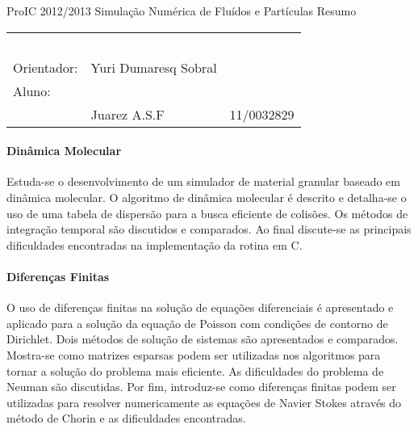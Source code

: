 \documentclass[a4paper,11pt]{article}
\begin{document}
\MakeMyTitlePage
{ProIC 2012/2013}
{Simulação Numérica de Fluídos e Partículas}
{Resumo}
{%
		\begin{tabular}{llr} \
		& & \\[0.05cm]		
		Orientador: & Yuri Dumaresq Sobral & \\
		
		Aluno:& & \\
		& Juarez A.S.F 					& 11/0032829\\

		\end{tabular}
}


\paragraph{Dinâmica Molecular}Estuda-se o desenvolvimento de
um simulador de material granular baseado em dinâmica molecular.
O algoritmo de dinâmica molecular é descrito e detalha-se o
uso de uma tabela de dispersão para a busca eficiente  de
colisões. Os métodos de integração temporal são discutidos e
comparados. Ao final discute-se as principais dificuldades
encontradas na implementação da rotina em C.

\paragraph{Diferenças Finitas}O uso de diferenças finitas na
solução de equações diferenciais é apresentado e aplicado
para a solução da equação de Poisson com condições de
contorno de Dirichlet. Dois métodos de solução de sistemas
são apresentados e comparados.
Mostra-se como matrizes esparsas podem ser utilizadas nos
algoritmos para tornar a solução do problema mais eficiente.
As dificuldades do problema de Neuman são discutidas.
Por fim, introduz-se como diferenças finitas podem ser
utilizadas para resolver numericamente as
equações de Navier Stokes através do método de Chorin e as
dificuldades encontradas.
\end{document}
